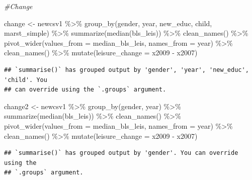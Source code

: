 \documentclass[
]{article}
\newenvironment{Shaded}{\begin{snugshade}}{\end{snugshade}}
\newcommand{\AttributeTok}[1]{\textcolor[rgb]{0.77,0.63,0.00}{#1}}
\newcommand{\CommentTok}[1]{\textcolor[rgb]{0.56,0.35,0.01}{\textit{#1}}}
\newcommand{\FunctionTok}[1]{\textcolor[rgb]{0.00,0.00,0.00}{#1}}
\newcommand{\NormalTok}[1]{#1}
\newcommand{\OtherTok}[1]{\textcolor[rgb]{0.56,0.35,0.01}{#1}}
\newcommand{\SpecialCharTok}[1]{\textcolor[rgb]{0.00,0.00,0.00}{#1}}
\begin{document}
\begin{Shaded}
\begin{Highlighting}[]
\CommentTok{\#Change}

\NormalTok{change }\OtherTok{\textless{}{-}}\NormalTok{ newcsv1 }\SpecialCharTok{\%\textgreater{}\%}
  \FunctionTok{group\_by}\NormalTok{(gender,  year, new\_educ, child, marst\_simple) }\SpecialCharTok{\%\textgreater{}\%}
  \FunctionTok{summarize}\NormalTok{(}\FunctionTok{median}\NormalTok{(bls\_leis)) }\SpecialCharTok{\%\textgreater{}\%}
  \FunctionTok{clean\_names}\NormalTok{() }\SpecialCharTok{\%\textgreater{}\%}
  \FunctionTok{pivot\_wider}\NormalTok{(}\AttributeTok{values\_from =}\NormalTok{ median\_bls\_leis, }\AttributeTok{names\_from =}\NormalTok{ year) }\SpecialCharTok{\%\textgreater{}\%}
  \FunctionTok{clean\_names}\NormalTok{() }\SpecialCharTok{\%\textgreater{}\%}
  \FunctionTok{mutate}\NormalTok{(}\AttributeTok{leisure\_change =}\NormalTok{ x2009 }\SpecialCharTok{{-}}\NormalTok{ x2007)}
\end{Highlighting}
\end{Shaded}

\begin{verbatim}
## `summarise()` has grouped output by 'gender', 'year', 'new_educ', 'child'. You
## can override using the `.groups` argument.
\end{verbatim}

\begin{Shaded}
\begin{Highlighting}[]
\NormalTok{change2 }\OtherTok{\textless{}{-}}\NormalTok{ newcsv1 }\SpecialCharTok{\%\textgreater{}\%}
  \FunctionTok{group\_by}\NormalTok{(gender, year) }\SpecialCharTok{\%\textgreater{}\%}
  \FunctionTok{summarize}\NormalTok{(}\FunctionTok{median}\NormalTok{(bls\_leis)) }\SpecialCharTok{\%\textgreater{}\%}
  \FunctionTok{clean\_names}\NormalTok{() }\SpecialCharTok{\%\textgreater{}\%}
  \FunctionTok{pivot\_wider}\NormalTok{(}\AttributeTok{values\_from =}\NormalTok{ median\_bls\_leis, }\AttributeTok{names\_from =}\NormalTok{ year) }\SpecialCharTok{\%\textgreater{}\%}
  \FunctionTok{clean\_names}\NormalTok{() }\SpecialCharTok{\%\textgreater{}\%}
  \FunctionTok{mutate}\NormalTok{(}\AttributeTok{leisure\_change =}\NormalTok{ x2009 }\SpecialCharTok{{-}}\NormalTok{ x2007)}
\end{Highlighting}
\end{Shaded}

\begin{verbatim}
## `summarise()` has grouped output by 'gender'. You can override using the
## `.groups` argument.
\end{verbatim}
\end{document}
